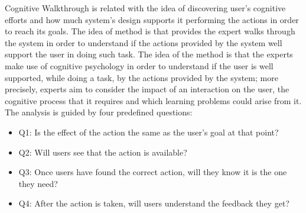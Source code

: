 \documentclass[12pt, a4paper]{article}
\numberwithin{figure}{section}
\begin{document}
Cognitive Walkthrough is related with the idea of discovering user's cognitive efforts and how much 
system's design supports it performing the actions in order to reach its goals.
The idea of method is that provides the expert walks through the system in order to understand if the actions 
provided by the system well support the user in doing such task. 
The idea of the method is that the experts make use of cognitive psychology in order to understand if the user is well supported, while doing a task,
by the actions provided by the system; more precisely, experts aim to consider the impact of an interaction on the user, 
the cognitive process that it requires and which learning problems could arise from it.
The analysis is guided by four predefined questions:
\begin{itemize}
	\item Q1: Is the effect of the action the same as the user’s goal at that point?
	\item Q2: Will users see that the action is available?
	\item Q3: Once users have found the correct action, will they know it is the one they need?
	\item Q4: After the action is taken, will users understand the feedback they get?
\end{itemize}
\end{document}

